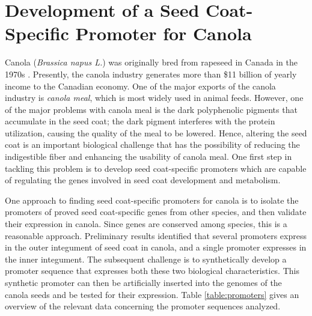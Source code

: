 \section{Development of a Seed Coat-Specific Promoter for Canola}

Canola ({\em Brassica napus L.}) was originally bred from rapeseed in Canada in the 1970s \cite{downey}. Presently, the canola industry generates more than \$11 billion of yearly income to the Canadian economy. One of the major exports of the canola industry is {\em canola meal}, which is most widely used in animal feeds. However, one of the major problems with canola meal is the dark polyphenolic pigments that accumulate in the seed coat; the dark pigment interferes with the protein utilization, causing the quality of the meal to be lowered. Hence, altering the seed coat is an important biological challenge that has the possibility of reducing the indigestible fiber and enhancing the usability of canola meal.  One first step in  tackling this problem is to develop seed coat-specific promoters which are capable of regulating the genes involved in seed coat development and metabolism. 

One approach to finding seed coat-specific promoters for canola is to isolate the promoters of proved seed coat-specific genes from other species, and then validate their expression in canola.  Since genes are conserved among species, this is a reasonable approach.  Preliminary results identified that several promoters express in the outer integument of seed coat in canola, and a single promoter expresses in the inner integument. The subsequent challenge is to synthetically develop a promoter sequence that expresses both these two biological characteristics.  This synthetic promoter can then be artificially inserted into the genomes of the canola seeds and be tested for their expression. Table \ref{table:promoters} gives an overview of the relevant data concerning the promoter sequences analyzed.      
     
